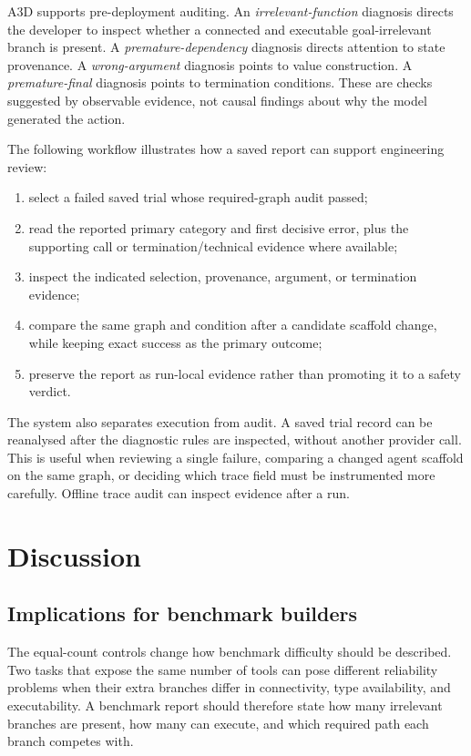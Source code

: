 \documentclass[pdflatex,sn-basic]{sn-jnl}
\begin{document}
A3D supports pre-deployment auditing. An \emph{irrelevant-function}
diagnosis directs the developer to inspect
whether a connected and executable goal-irrelevant branch is present. A
\emph{premature-dependency} diagnosis directs attention to state provenance. A
\emph{wrong-argument} diagnosis points to value construction. A
\emph{premature-final} diagnosis points to termination conditions. These are
checks suggested by observable evidence, not causal findings about why the
model generated the action.

The following workflow illustrates how a saved report can support engineering
review:
\begin{enumerate}
\item select a failed saved trial whose required-graph audit passed;
\item read the reported primary category and first decisive error, plus the
  supporting call or termination/technical evidence where available;
\item inspect the indicated selection, provenance, argument, or termination
  evidence;
\item compare the same graph and condition after a candidate scaffold change,
  while keeping exact success as the primary outcome;
\item preserve the report as run-local evidence rather than promoting it to a
  safety verdict.
\end{enumerate}

The system also separates execution from audit. A saved trial record can be
reanalysed after the diagnostic rules are inspected, without another provider
call. This is useful when reviewing a single failure, comparing a changed agent
scaffold on the same graph, or deciding which trace field must be instrumented
more carefully. Offline trace audit can inspect evidence after a run.

\section{Discussion}

\subsection{Implications for benchmark builders}

The equal-count controls change how benchmark difficulty should be described.
Two tasks that expose the same number of tools can pose different reliability
problems when their extra branches differ in connectivity, type availability,
and executability. A benchmark report should therefore state how many irrelevant
branches are present, how many can execute, and which required path each branch
competes with.
\end{document}

